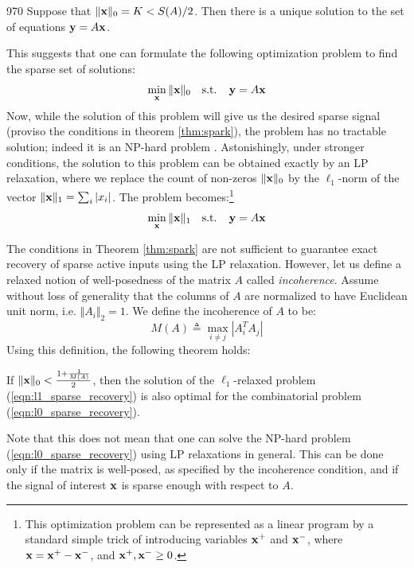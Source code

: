 \begin{theorem}
970\label{thm:spark}
Suppose that $\Vert \mathbf{x} \Vert_0 = K < S(A) / 2$. Then there is a unique solution to the
set of equations $\mathbf{y} = A \mathbf{x}$.
\end{theorem}

This suggests that one can formulate the following optimization problem to find the sparse set of solutions:
\begin{equation}
\label{eqn:l0_sparse_recovery}
\min_{\mathbf{x}} \Vert \mathbf{x} \Vert_0  ~~\mbox{ s.t. }~~ \mathbf{y} = A \mathbf{x}
\end{equation}
Now, while the solution of this problem will give us the desired sparse signal (proviso the conditions in
theorem \ref{thm:spark}), the problem has no tractable solution; indeed it is an NP-hard problem \cite{natarajan1995sparse_recovery_complexity}. Astonishingly, under stronger conditions, the solution to this problem can be obtained exactly by an LP relaxation, where we replace the count of non-zeros $\Vert \mathbf{x} \Vert_0$  by the $\ell_1$-norm
of the vector $\Vert \mathbf{x} \Vert_1 = \sum_i | x_i|$. The problem becomes:\footnote{This optimization problem can be represented as a linear
program by a standard simple trick of introducing variables $\mathbf{x}^+$ and $\mathbf{x}^-$, where $\mathbf{x} = \mathbf{x}^+ - \mathbf{x}^-$,
and $\mathbf{x}^+, \mathbf{x}^- \ge 0$. }
\begin{equation}
\label{eqn:l1_sparse_recovery}
\min_{\mathbf{x}} \Vert \mathbf{x} \Vert_1  ~~\mbox{ s.t. }~~ \mathbf{y} = A \mathbf{x}
\end{equation}

The conditions in Theorem \ref{thm:spark} are not sufficient to guarantee exact recovery of
sparse active inputs using the LP relaxation. However, let us define a relaxed notion of
well-posedness of the matrix $A$ called \emph{incoherence}. Assume without loss of generality that
the columns of $A$ are normalized to have Euclidean unit norm, i.e. $\Vert A_i \Vert_2 = 1$.  We define the incoherence of $A$ to be:
\begin{equation}
M(A) \triangleq \max_{i \ne j} | A_i^T A_j |
\end{equation}
Using this definition, the following theorem holds:
\begin{theorem}
\label{thm:incoherence}
If $\Vert \mathbf{x} \Vert_0 < \frac{ 1 + \frac{1}{M(A)}} {2}$, then the solution of the $\ell_1$-relaxed
problem (\ref{eqn:l1_sparse_recovery}) is also optimal for the combinatorial problem
(\ref{eqn:l0_sparse_recovery}).
\end{theorem}

Note that this does not mean that one can solve the NP-hard problem (\ref{eqn:l0_sparse_recovery})
using LP relaxations in general. This can be done only if the matrix is well-posed, as
specified by the incoherence condition, and if the signal of interest $\mathbf{x}$ is sparse enough
with respect to $A$.

